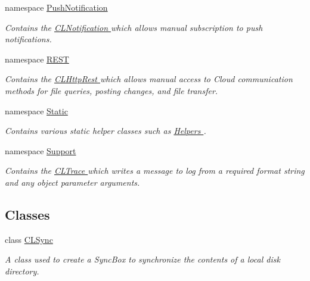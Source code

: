 \begin{DoxyCompactItemize}
namespace \hyperlink{namespace_cloud_api_public_1_1_push_notification}{Push\-Notification}
\begin{DoxyCompactList}\small\item\em Contains the \hyperlink{class_cloud_api_public_1_1_push_notification_1_1_c_l_notification}{C\-L\-Notification } which allows manual subscription to push notifications. \end{DoxyCompactList}\item 
namespace \hyperlink{namespace_cloud_api_public_1_1_r_e_s_t}{R\-E\-S\-T}
\begin{DoxyCompactList}\small\item\em Contains the \hyperlink{class_cloud_api_public_1_1_r_e_s_t_1_1_c_l_http_rest}{C\-L\-Http\-Rest } which allows manual access to Cloud communication methods for file queries, posting changes, and file transfer. \end{DoxyCompactList}\item 
namespace \hyperlink{namespace_cloud_api_public_1_1_static}{Static}
\begin{DoxyCompactList}\small\item\em Contains various static helper classes such as \hyperlink{class_cloud_api_public_1_1_static_1_1_helpers}{Helpers }. \end{DoxyCompactList}\item 
namespace \hyperlink{namespace_cloud_api_public_1_1_support}{Support}
\begin{DoxyCompactList}\small\item\em Contains the \hyperlink{class_cloud_api_public_1_1_support_1_1_c_l_trace}{C\-L\-Trace } which writes a message to log from a required format string and any object parameter arguments. \end{DoxyCompactList}\end{DoxyCompactItemize}
\subsection*{Classes}
\begin{DoxyCompactItemize}
\item 
class \hyperlink{class_cloud_api_public_1_1_c_l_sync}{C\-L\-Sync}
\begin{DoxyCompactList}\small\item\em A class used to create a Sync\-Box to synchronize the contents of a local disk directory. \end{DoxyCompactList}\end{DoxyCompactItemize}
